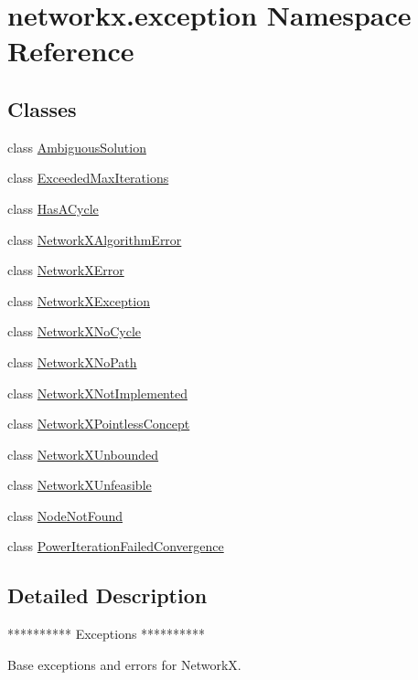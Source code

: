 \hypertarget{namespacenetworkx_1_1exception}{}\section{networkx.\+exception Namespace Reference}
\label{namespacenetworkx_1_1exception}
\subsection*{Classes}
\begin{DoxyCompactItemize}
\item 
class \hyperlink{classnetworkx_1_1exception_1_1AmbiguousSolution}{Ambiguous\+Solution}
\item 
class \hyperlink{classnetworkx_1_1exception_1_1ExceededMaxIterations}{Exceeded\+Max\+Iterations}
\item 
class \hyperlink{classnetworkx_1_1exception_1_1HasACycle}{Has\+A\+Cycle}
\item 
class \hyperlink{classnetworkx_1_1exception_1_1NetworkXAlgorithmError}{Network\+X\+Algorithm\+Error}
\item 
class \hyperlink{classnetworkx_1_1exception_1_1NetworkXError}{Network\+X\+Error}
\item 
class \hyperlink{classnetworkx_1_1exception_1_1NetworkXException}{Network\+X\+Exception}
\item 
class \hyperlink{classnetworkx_1_1exception_1_1NetworkXNoCycle}{Network\+X\+No\+Cycle}
\item 
class \hyperlink{classnetworkx_1_1exception_1_1NetworkXNoPath}{Network\+X\+No\+Path}
\item 
class \hyperlink{classnetworkx_1_1exception_1_1NetworkXNotImplemented}{Network\+X\+Not\+Implemented}
\item 
class \hyperlink{classnetworkx_1_1exception_1_1NetworkXPointlessConcept}{Network\+X\+Pointless\+Concept}
\item 
class \hyperlink{classnetworkx_1_1exception_1_1NetworkXUnbounded}{Network\+X\+Unbounded}
\item 
class \hyperlink{classnetworkx_1_1exception_1_1NetworkXUnfeasible}{Network\+X\+Unfeasible}
\item 
class \hyperlink{classnetworkx_1_1exception_1_1NodeNotFound}{Node\+Not\+Found}
\item 
class \hyperlink{classnetworkx_1_1exception_1_1PowerIterationFailedConvergence}{Power\+Iteration\+Failed\+Convergence}
\end{DoxyCompactItemize}


\subsection{Detailed Description}
\begin{DoxyVerb}**********
Exceptions
**********

Base exceptions and errors for NetworkX.
\end{DoxyVerb}
 
